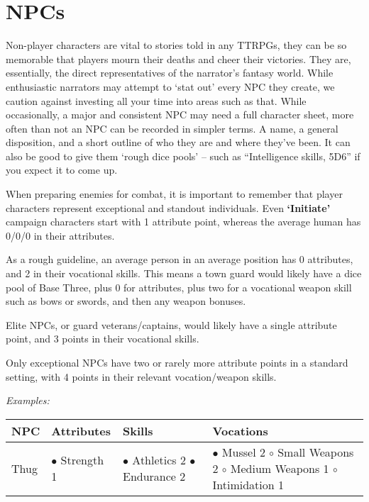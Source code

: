 \section{NPCs}

Non-player characters are vital to stories told in any TTRPGs, they can be so memorable that players mourn their deaths and cheer their victories. They are, essentially, the direct representatives of the narrator’s fantasy world. While enthusiastic narrators may attempt to ‘stat out’ every NPC they create, we caution against investing all your time into areas such as that. While occasionally, a major and consistent NPC may need a full character sheet, more often than not an NPC can be recorded in simpler terms. A name, a general disposition, and a short outline of who they are and where they’ve been. It can also be good to give them ‘rough dice pools’ – such as “Intelligence skills, 5D6” if you expect it to come up.

When preparing enemies for combat, it is important to remember that player characters represent exceptional and standout individuals. Even \textbf{‘Initiate’} campaign characters start with 1 attribute point, whereas the average human has 0/0/0 in their attributes.

As a rough guideline, an average person in an average position has 0 attributes, and 2 in their vocational skills. This means a town guard would likely have a dice pool of Base Three, plus 0 for attributes, plus two for a vocational weapon skill such as bows or swords, and then any weapon bonuses.

Elite NPCs, or guard veterans/captains, would likely have a single attribute point, and 3 points in their vocational skills.

Only exceptional NPCs have two or rarely more attribute points in a standard setting, with 4 points in their relevant vocation/weapon skills.

\textit{Examples:}

\begin{center}
    \begin{tabular}{|p{} p{} p{} p{}|} 
        \hline 
        \textbf{NPC} & \textbf{Attributes} & \textbf{Skills} & \textbf{Vocations} \\ 
        \hline
        Thug & 
            $\bullet$ Strength 1 & 
                $\bullet$ Athletics 2 \newline 
                $\bullet$ Endurance 2 & 
                    $\bullet$ Mussel 2 \newline
                    \hspace*{.7em} $\circ$ Small Weapons 2 \newline
                    \hspace*{.7em} $\circ$ Medium Weapons 1 \newline
                    \hspace*{.7em} $\circ$ Intimidation 1 \\
        \hline
    \end{tabular}
\end{center}

